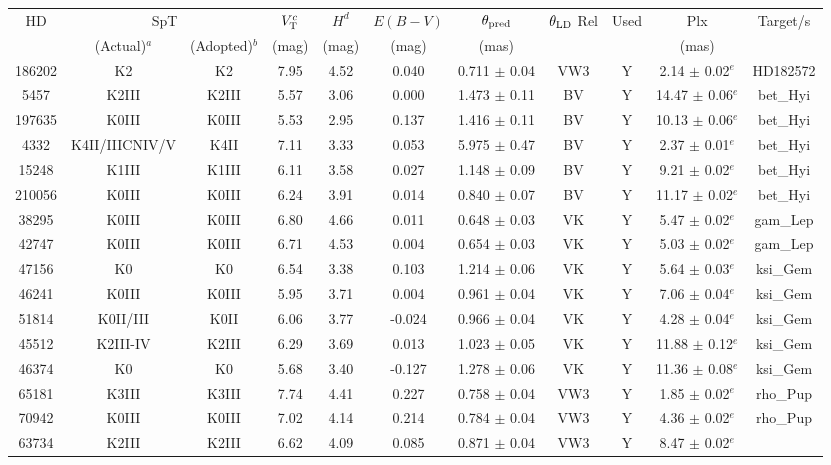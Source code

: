 \begin{tabular}{ccccccccccc}
\hline
HD & \multicolumn{2}{c}{SpT} & $V_{\rm T}^c$ & $H^d$ & $E(B-V)$ & $\theta_{\rm pred}$ & $\theta_{\rm LD}$ Rel & Used & Plx & Target/s \\
 & (Actual)$^a$ & (Adopted)$^b$ & (mag) & (mag) & (mag) & (mas) &  &  & (mas) &  \\
\hline
186202 & K2 & K2 & 7.95 & 4.52 & 0.040 & 0.711 $\pm$ 0.04 & VW3 & Y & 2.14 $\pm$ 0.02$^e$ &HD182572\\
5457 & K2III & K2III & 5.57 & 3.06 & 0.000 & 1.473 $\pm$ 0.11 & BV & Y & 14.47 $\pm$ 0.06$^e$ &bet_Hyi\\
197635 & K0III & K0III & 5.53 & 2.95 & 0.137 & 1.416 $\pm$ 0.11 & BV & Y & 10.13 $\pm$ 0.06$^e$ &bet_Hyi\\
4332 & K4II/IIICNIV/V & K4II & 7.11 & 3.33 & 0.053 & 5.975 $\pm$ 0.47 & BV & Y & 2.37 $\pm$ 0.01$^e$ &bet_Hyi\\
15248 & K1III & K1III & 6.11 & 3.58 & 0.027 & 1.148 $\pm$ 0.09 & BV & Y & 9.21 $\pm$ 0.02$^e$ &bet_Hyi\\
210056 & K0III & K0III & 6.24 & 3.91 & 0.014 & 0.840 $\pm$ 0.07 & BV & Y & 11.17 $\pm$ 0.02$^e$ &bet_Hyi\\
38295 & K0III & K0III & 6.80 & 4.66 & 0.011 & 0.648 $\pm$ 0.03 & VK & Y & 5.47 $\pm$ 0.02$^e$ &gam_Lep\\
42747 & K0III & K0III & 6.71 & 4.53 & 0.004 & 0.654 $\pm$ 0.03 & VK & Y & 5.03 $\pm$ 0.02$^e$ &gam_Lep\\
47156 & K0 & K0 & 6.54 & 3.38 & 0.103 & 1.214 $\pm$ 0.06 & VK & Y & 5.64 $\pm$ 0.03$^e$ &ksi_Gem\\
46241 & K0III & K0III & 5.95 & 3.71 & 0.004 & 0.961 $\pm$ 0.04 & VK & Y & 7.06 $\pm$ 0.04$^e$ &ksi_Gem\\
51814 & K0II/III & K0II & 6.06 & 3.77 & -0.024 & 0.966 $\pm$ 0.04 & VK & Y & 4.28 $\pm$ 0.04$^e$ &ksi_Gem\\
45512 & K2III-IV & K2III & 6.29 & 3.69 & 0.013 & 1.023 $\pm$ 0.05 & VK & Y & 11.88 $\pm$ 0.12$^e$ &ksi_Gem\\
46374 & K0 & K0 & 5.68 & 3.40 & -0.127 & 1.278 $\pm$ 0.06 & VK & Y & 11.36 $\pm$ 0.08$^e$ &ksi_Gem\\
65181 & K3III & K3III & 7.74 & 4.41 & 0.227 & 0.758 $\pm$ 0.04 & VW3 & Y & 1.85 $\pm$ 0.02$^e$ &rho_Pup\\
70942 & K0III & K0III & 7.02 & 4.14 & 0.214 & 0.784 $\pm$ 0.04 & VW3 & Y & 4.36 $\pm$ 0.02$^e$ &rho_Pup\\
  63734 & K2III & K2III & 6.62 & 4.09 & 0.085 & 0.871 $\pm$ 0.04 & VW3 & Y & 8.47 $\pm$ 0.02$^e$ &\\

\end{tabular}
